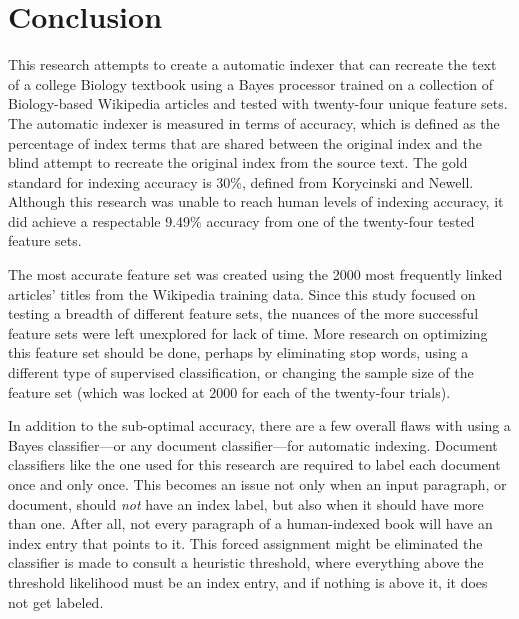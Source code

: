 \pagebreak
\section{Conclusion}

This research attempts to create a automatic indexer that can recreate the text of a college Biology textbook using a \naive Bayes processor trained on a collection of Biology-based Wikipedia articles and tested with twenty-four unique feature sets.
The automatic indexer is measured in terms of accuracy, which is defined as the percentage of index terms that are shared between the original index and the blind attempt to recreate the original index from the source text.
The gold standard for indexing accuracy is 30\%, defined from Korycinski and Newell\cite{automatic-indexing}.
Although this research was unable to reach human levels of indexing accuracy, it did achieve a respectable 9.49\% accuracy from one of the twenty-four tested feature sets.

The most accurate feature set was created using the 2000 most frequently linked articles' titles from the Wikipedia training data.
Since this study focused on testing a breadth of different feature sets, the nuances of the more successful feature sets were left unexplored for lack of time.
More research on optimizing this feature set should be done, perhaps by eliminating stop words, using a different type of supervised classification, or changing the sample size of the feature set (which was locked at 2000 for each of the twenty-four trials).

In addition to the sub-optimal accuracy, there are a few overall flaws with using a \naive Bayes classifier---or any document classifier---for automatic indexing.
Document classifiers like the one used for this research are required to label each document once and only once.
This becomes an issue not only when an input paragraph, or document, should {\it not} have an index label, but also when it should have more than one.
After all, not every paragraph of a human-indexed book will have an index entry that points to it.
This forced assignment might be eliminated the classifier is made to consult a heuristic threshold, where everything above the threshold likelihood must be an index entry, and if nothing is above it, it does not get labeled.

